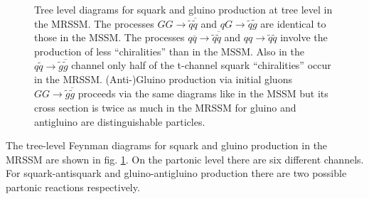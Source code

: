 \begin{figure}[!htbp]
\begin{center}
\caption{Tree level diagrams for squark and gluino production at tree level in the MRSSM. The processes $GG \to \tilde{q}\overline{\tilde{q}}$ and $qG \to \tilde{q}\tilde{g}$ are identical to those in the MSSM. The processes $q\overline{q} \to \tilde{q}\overline{\tilde{q}}$ and $qq \to \tilde{q}\tilde{q}$ involve the production of less ``chiralities'' than in the MSSM. Also in the $q\tilde{q} \to \tilde{g}\overline{\tilde{g}}$ channel only half of the t-channel squark ``chiralities'' occur in the MRSSM. (Anti-)Gluino production via initial gluons $GG \to \tilde{g}\overline{\tilde{g}}$ proceeds via the same diagrams like in the MSSM but its cross section is twice as much in the MRSSM for gluino and antigluino are distinguishable particles.}\label{fig:TreeDiagrams}
\end{center}
\end{figure}
The tree-level Feynman diagrams for squark and gluino production in the MRSSM are shown in fig. \ref{fig:TreeDiagrams}. On the partonic level there are six different channels. For squark-antisquark  and gluino-antigluino production there are two possible partonic reactions respectively.\\
